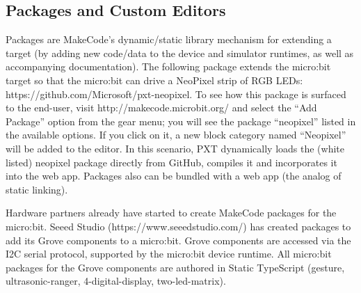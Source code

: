 \subsection{Packages and Custom Editors}

Packages are MakeCode's dynamic/static library mechanism for extending a target (by adding new code/data to the device
and simulator runtimes, as well as accompanying documentation). The following package extends the micro:bit target so
that the micro:bit can drive a NeoPixel strip of RGB LEDs: https://github.com/Microsoft/pxt-neopixel. To see how this
package is surfaced to the end-user, visit http://makecode.microbit.org/ and select the ``Add Package'' option from the
gear menu; you will see the package ``neopixel'' listed in the available options. If you click on it, a new block category
named ``Neopixel'' will be added to the editor. In this scenario, PXT dynamically loads the (white listed) neopixel 
package directly from GitHub, compiles it and incorporates it into the web app. Packages also can be bundled with a web
app (the analog of static linking).  

Hardware partners already have started to create MakeCode packages for the micro:bit.
Seeed Studio (https://www.seeedstudio.com/) has created packages to add its Grove components to a micro:bit.
Grove components are accessed via the I2C serial protocol, supported by the micro:bit device runtime.
All micro:bit packages for the Grove components are authored in Static TypeScript (gesture, ultrasonic-ranger,
4-digital-display, two-led-matrix).

